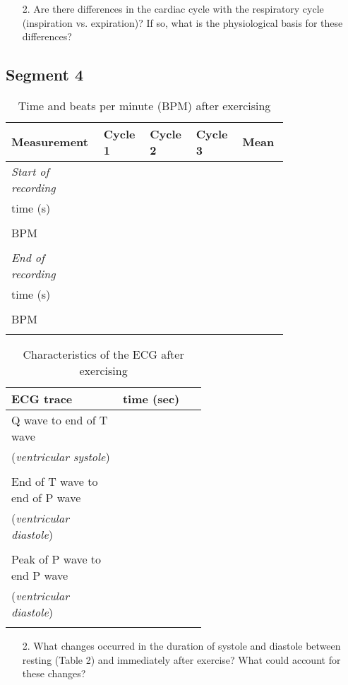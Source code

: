 \documentclass{article}
\begin{document}
\begin{itemize}
	\item[2.] Are there differences in the cardiac cycle with the respiratory cycle (inspiration vs. expiration)? If so, what is the physiological basis for these differences?\pagebreak
\end{itemize}

\subsection*{Segment 4}
\begin{table}[h]
	\centering
	\caption{Time and beats per minute (BPM) after exercising}
	\begin{tabular}[h!]{p{0.18\linewidth}|p{0.15\linewidth}p{0.15\linewidth}p{0.15\linewidth}p{0.15\linewidth}}
	\toprule
	Measurement & Cycle 1 & Cycle 2 & Cycle 3 & Mean\\
	\midrule
	\textit{Start of recording} & & & &\\
	\textDelta time (s) & & & &\\& & & &\\
	BPM & & & &\\& & & &\\
	\textit{End of recording} & & & &\\
	\textDelta time (s) & & & &\\& & & &\\
	BPM & & & &\\& & & &\\
	\bottomrule
	\end{tabular}
	\end{table}\vspace{1cm}
	
\begin{table}[h]
	\centering
	\caption{Characteristics of the ECG after exercising}
	\begin{tabular}[h!]{p{0.3\linewidth}|p{0.25\linewidth}}
	\toprule
	ECG trace & \textDelta time (sec)\\
	\midrule
	Q wave to end of T wave & \\(\textit{ventricular systole})& \\& \\
	End of T wave to end of P wave & \\(\textit{ventricular diastole})& \\& \\
	Peak of P wave to end P wave & \\(\textit{ventricular diastole})& \\& \\
	\bottomrule
	\end{tabular}
	\end{table}
	
\begin{itemize}
	\item[2.] What changes occurred in the duration of systole and diastole between resting (Table 2) and immediately after exercise? What could account for these changes?
\end{itemize}
\end{document}
